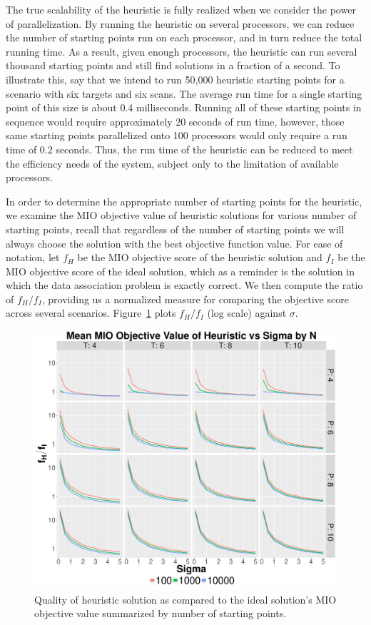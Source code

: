The true scalability of the heuristic is fully realized when we consider the power of parallelization. By running the heuristic on several processors, we can reduce the number of starting points run on each processor, and in turn reduce the total running time. As a result, given enough processors, the heuristic can run several thousand starting points and still find solutions in a fraction of a second. To illustrate this, say that we intend to run 50,000 heuristic starting points for a scenario with six targets and six scans. The average run time for a single starting point of this size is about 0.4 milliseconds. Running all of these starting points in sequence would require approximately 20 seconds of run time, however, those same starting points parallelized onto 100 processors would only require a run time of 0.2 seconds. Thus, the run time of the heuristic can be reduced to meet the efficiency needs of the system, subject only to the limitation of available processors. 

In order to determine the appropriate number of starting points for the heuristic, we examine the MIO objective value of heuristic solutions for various number of starting points, recall that regardless of the number of starting points we will always choose the solution with the best objective function value. For ease of notation, let $f_{H}$ be the MIO objective score of the heuristic solution and $f_{I}$ be the MIO objective score of the ideal solution, which as a reminder is the solution in which the data association problem is exactly correct. We then compute the ratio of $f_{H}/f_{I}$, providing us a normalized measure for comparing the objective score across several scenarios. Figure~\ref{fig:Basic_Heuristic_Objective} plots $f_{H}/f_{I}$ (log scale)  against $\sigma$.
\begin{figure}[ht]
  \centering
  \includegraphics[width=\columnwidth]{../Figures/Basic_Heuristic_Objective}
  \caption{Quality of heuristic solution as compared to the ideal solution's MIO objective value summarized by number of starting points.}
  \label{fig:Basic_Heuristic_Objective}
\end{figure}

